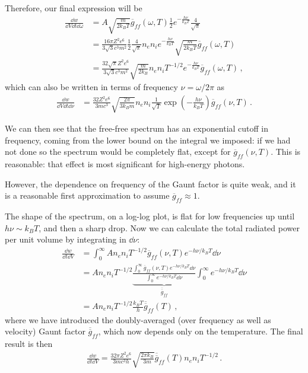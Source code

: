 \documentclass[main.tex]{subfiles}
\begin{document}
Therefore, our final expression will be 
%
\begin{align}
\frac{ \dd{w}}{ \dd{V} \dd{t} \dd{\omega }} 
&= A \sqrt{ \frac{m}{2 k_B T}} \overline{g}_{ff} (\omega , T ) \frac{1}{2} e^{- \frac{h \nu }{k_B T}} \frac{4}{\sqrt{\pi }}  \\
&= \frac{16 \pi Z^2 e^{6}}{3 \sqrt{3} c^3 m^2 } \frac{1}{2} \frac{4}{\sqrt{\pi }} n_e n_i e^{- \frac{h \nu }{k_B T}} \sqrt{ \frac{m}{2 k_B T}} \overline{g}_{ff}(\omega , T)   \\
&= \frac{32 \sqrt{\pi } Z^2 e^{6}}{3 \sqrt{3} c^3 m^2}
\sqrt{ \frac{m}{2 k_B}} n_e n_i T^{-1/2} e^{- \frac{h \nu }{k_B T}} \overline{g}_{ff} (\omega, T)
\,,
\end{align}
%
which can also be written in terms of frequency \(\nu = \omega / 2 \pi \) as  
%
\begin{align}
\frac{ \dd{w}}{ \dd{V} \dd{t} \dd{\nu }}
&= \frac{32 Z^2 e^{6}}{3 m c^3} \sqrt{ \frac{2 \pi }{3 k_B m}} n_e n_i \frac{1}{\sqrt{T}} \exp(- \frac{h \nu }{k_B T}) \overline{g}_{ff}(\nu , T)  
\,.
\end{align}

We can then see that the free-free spectrum has an exponential cutoff in frequency, coming from the lower bound on the integral we imposed: if we had not done so the spectrum would be completely flat, except for \(\overline{g}_{ff}(\nu , T)\).
This is reasonable: that effect is most significant for high-energy photons. 

However, the dependence on frequency of the Gaunt factor is quite weak, and it is a reasonable first approximation to assume \(\overline{g}_{ff} \approx 1\).

The shape of the spectrum, on a log-log plot, is flat for low frequencies up until \(h \nu \sim k_B T\), and then a sharp drop. 
Now we can calculate the total radiated power per unit volume by integrating in \(\dd{\nu }\): 
%
\begin{align}
\frac{ \dd{w}}{ \dd{t} \dd{V}} 
&= \int_{0}^{\infty } A n_e n_i T^{-1/2} \overline{g}_{ff} (\nu, T) e^{-h \nu / k_B T} \dd{\nu }  \\
&= A n_e n_i T^{-1/2} \underbrace{\frac{\int_{0}^{\infty } \overline{g}_{ff} (\nu, T) e^{-h \nu /k_B T} \dd{\nu }}{\int_0^{\infty} e^{- h \nu / k_B T} \dd{\nu } }}_{\overline{\overline{g}}_{ff}}  
\int_0^{\infty} e^{- h \nu / k_B T} \dd{\nu }
\\
&= A n_e n_i T^{-1/2} \frac{k_B T}{h } \overline{\overline{g}}_{ff}(T)
\,,
\end{align}
%
where we have introduced the doubly-averaged (over frequency as well as velocity) Gaunt factor \(\overline{\overline{g}}_{ff}\), which now depends only on the temperature. The final result is then 
%
\begin{align}
\frac{ \dd{w}}{ \dd{t} \dd{V}} = \frac{32 \pi Z^2 e^{6}}{3 m c^3h} \sqrt{\frac{2 \pi k_B}{3 m}} \overline{\overline{g}}_{ff}(T)  n_en_i T^{-1/2}
\,.
\end{align}
\end{document}
